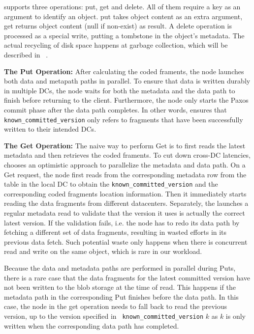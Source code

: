 {\name} supports three operations: put, get and delete. All of them require a key as
an argument to identify an object. put takes object content as an extra argument, get
returns object content (null if non-exist) as result. A delete operation is processed
as a special write, putting a tombstone in the object's metadata. The actual recycling
of disk space happens at garbage collection, which will be described in ~.

{\bf The Put Operation:}
After calculating the coded framents, the \name node launches both data and
metapath paths in parallel.  To ensure that data is written durably in multiple
DCs, the \name node waits for both the metadata and the data path to finish
before returning to the client.  Furthermore, the \name node only starts 
the Paxos commit phase after the data path completes. In other words, \name 
ensures that {\tt known\_committed\_version} only refers to fragments
that have been successfully written to their intended DCs.
 
{\bf The Get Operation:}
The naive way to perform Get is to first reads the latest metadata and then retrieves 
the coded framents. 
To cut down cross-DC latencies, {\name} chooses an optimistic approach to parallelize the metadata and data path.
On a Get request, the {\name} node first reads from the corresponding metadata row from the table in the local DC
to obtain the {\tt known\_committed\_version} and the corresponding coded 
fragments location information. Then it immediately starts reading the data fragments from different
datacenters.  Separately, the {\name} launches a regular metadata read to validate that the version it uses is actually
the correct latest version. If the validation fails, i.e. the \name node
has to redo its data path by fetching a different set of data fragments,
resulting in wasted efforts in its previous data fetch.  Such potential waste
only happens when there is concurrent read and write on the same object, which
is rare in our workload.

Because the data and metadata paths are performed in parallel during Puts,
there is a rare case that the data fragments for the latest committed version
have not been written to the blob storage at the time of read. This happens if 
the metadata path in the corresponding Put finishes before the data path. In
this case, the {\name} node in the get operation needs to fall back to read the
previous version, up to the version specified in {\tt
known\_committed\_version} $k$ as $k$ is only written when the corresponding
data path has completed.

